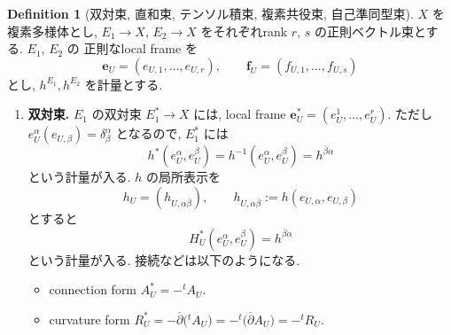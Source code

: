 \documentclass[dvipdfmx,a4paper,11pt]{article} %
\theoremstyle{definition}
\newtheorem{defn}[thm]{Definition}
\theoremstyle{remark}
\numberwithin{equation}{section}
\begin{document}
\begin{defn}[双対束, 直和束, テンソル積束, 複素共役束, 自己準同型束]
\label{defn-tensor-connection}
\(X\) を複素多様体とし, \(E_1\to X\), \(E_2\to X\) をそれぞれrank \(r\), \(s\) の正則ベクトル束とする. \(E_1\), \(E_2\) の 正則なlocal frame を
\[
\mathbf{e}_U=(e_{U,1},\ldots,e_{U,r}),\qquad \mathbf{f}_U=(f_{U,1},\ldots,f_{U,s})
\]
とし, \(h^{E_1}, h^{E_2}\) を計量とする.
\begin{enumerate}
\item \textbf{双対束.} \(E_1\) の双対束 \(E_1^*\to X\) には, local frame \(
\mathbf{e}_U^*=(e_U^1,\ldots,e_U^r)\). ただし \(e_U^\alpha(e_{U,\beta})=\delta^\alpha_\beta
\)
となるので, \(E_1^{*}\) には
\[
h^{*}(e_U^\alpha, e_U^\beta)=h^{-1}(e_U^\alpha, e_U^\beta)
=h^{\overline{\beta}\alpha}
\]
という計量が入る. \(h\) の局所表示を
\[
h_U=(h_{U,\alpha\overline{\beta}}),\qquad h_{U,\alpha\overline{\beta}}:=h(e_{U,\alpha},e_{U,\beta})
\]
とすると
\[
H^{*}_{U} (e_U^\alpha, e_U^\beta)
= h^{\overline{\beta}\alpha}
\]
という計量が入る. 接続などは以下のようになる.
\begin{itemize}
\item connection form \(A_U^*=-{}^{t}A_U\).
\item curvature form
\(
R_U^*
=
-\overline{\partial}\bigl({}^{t}A_U\bigr)
=
-{}^{t}\bigl(\overline{\partial}A_U\bigr)
=
-{}^{t}R_U.
\)
\end{itemize}


\end{enumerate}
\end{defn}
\end{document}
